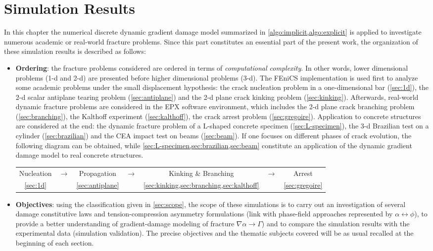 \chapter{Simulation Results} \label{chap:simulation}
\minitoc

In this chapter the numerical discrete dynamic gradient damage model summarized in \cref{algo:implicit,algo:explicit} is applied to investigate numerous academic or real-world fracture problems. Since this part constitutes an essential part of the present work, the organization of these simulation results is described as follows:
\begin{itemize}
\item \textbf{Ordering}: the fracture problems considered are ordered in terms of \emph{computational complexity}. In other words, lower dimensional problems (1-d and 2-d) are presented before higher dimensional problems (3-d). The FEniCS implementation is used first to analyze some academic problems under the small displacement hypothesis: the crack nucleation problem in a one-dimensional bar (\cref{sec:1d}), the 2-d scalar antiplane tearing problem (\cref{sec:antiplane}) and the 2-d plane crack kinking problem (\cref{sec:kinking}). Afterwards, real-world dynamic fracture problems are considered in the EPX software environment, which includes the 2-d plane crack branching problem (\cref{sec:branching}), the Kalthoff experiment (\cref{sec:kalthoff}), the crack arrest problem (\cref{sec:gregoire}). Application to concrete structures are considered at the end: the dynamic fracture problem of a L-shaped concrete specimen (\cref{sec:L-specimen}), the 3-d Brazilian test on a cylinder (\cref{sec:brazilian}) and the CEA impact test on beams (\cref{sec:beam}). If one focuses on different phases of crack evolution, the following diagram can be obtained, while \cref{sec:L-specimen,sec:brazilian,sec:beam} constitute an application of the dynamic gradient damage model to real concrete structures.
\begin{center}
\begin{tabular}{ccccccc}
Nucleation &$\to$& Propagation &$\to$& Kinking \& Branching &$\to$& Arrest \\
\cref{sec:1d} && \cref{sec:antiplane} && \cref{sec:kinking,sec:branching,sec:kalthoff} && \cref{sec:gregoire}
\end{tabular}
\end{center}

\item \textbf{Objectives}: using the classification given in \cref{sec:scope}, the scope of these simulations is to carry out an investigation of several damage constitutive laws and tension-compression asymmetry formulations (link with phase-field approaches represented by $\alpha\leftrightarrow\phi$), to provide a better understanding of gradient-damage modeling of fracture $\nabla\alpha\to\Gamma$) and to compare the simulation results with the experimental data (simulation validation). The precise objectives and the thematic subjects covered will be as usual recalled at the beginning of each section.
\end{itemize}

